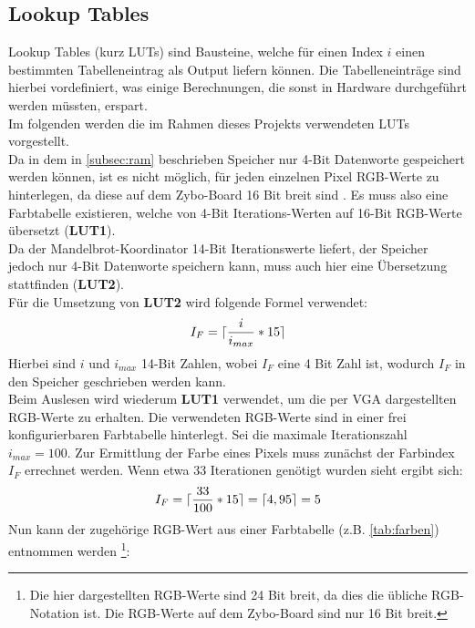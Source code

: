 \documentclass[a4paper,12pt,onesided]{report}
\begin{document}
\subsection{Lookup Tables}
\label{subsec:luts}
Lookup Tables (kurz LUTs) sind Bausteine, welche für einen Index $i$ einen bestimmten Tabelleneintrag als Output liefern können.
Die Tabelleneinträge sind hierbei vordefiniert, was einige Berechnungen, die sonst in Hardware durchgeführt werden müssten, erspart.\\
Im folgenden werden die im Rahmen dieses Projekts %
verwendeten LUTs vorgestellt.\\
Da in dem in \autoref{subsec:ram} beschrieben Speicher nur 4-Bit Datenworte gespeichert werden können, ist es nicht möglich, für jeden einzelnen Pixel RGB-Werte zu hinterlegen, da diese auf dem Zybo-Board 16 Bit breit sind \cite{zyboref}. Es muss also eine Farbtabelle existieren, welche von 4-Bit Iterations-Werten auf 16-Bit RGB-Werte übersetzt (\textbf{LUT1}).\\
Da der Mandelbrot-Koordinator 14-Bit Iterationswerte liefert, der Speicher jedoch nur 4-Bit %
Datenworte speichern kann, muss auch hier eine Übersetzung stattfinden (\textbf{LUT2}).\\
Für die Umsetzung von \textbf{LUT2} wird folgende Formel verwendet:
\[I_F = \lceil\frac{i}{i_{max}}*15\rceil\]
Hierbei sind $i$ und $i_{max}$ 14-Bit Zahlen, wobei $I_F$ eine 4 Bit Zahl ist, wodurch $I_F$ in den Speicher geschrieben werden kann.\\
Beim Auslesen wird wiederum \textbf{LUT1} verwendet, um die per VGA dargestellten RGB-Werte zu erhalten.
Die verwendeten RGB-Werte sind in einer frei konfigurierbaren %
Farbtabelle hinterlegt.
Sei die maximale Iterationszahl $i_{max} = 100$.
Zur Ermittlung der Farbe eines Pixels muss zunächst der Farbindex $I_F$ errechnet werden. Wenn etwa 33 Iterationen genötigt wurden sieht ergibt sich:
\[I_F = \lceil\frac{33}{100}*15\rceil = \lceil4,95\rceil = 5\]
Nun kann der zugehörige RGB-Wert aus einer Farbtabelle (z.B. \autoref{tab:farben}) entnommen werden 
\footnote{Die hier dargestellten RGB-Werte sind 24 Bit breit, da dies die übliche RGB-Notation ist. Die RGB-Werte auf dem Zybo-Board sind nur 16 Bit breit.}:
\end{document}
